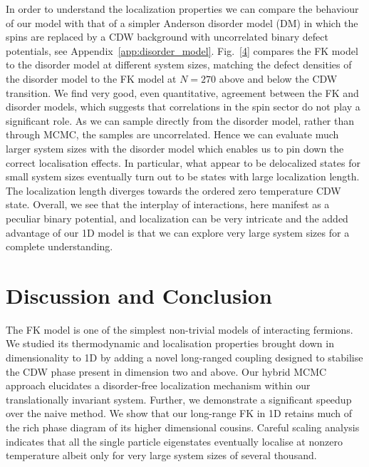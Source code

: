 In order to understand the localization properties we can compare the behaviour of our model with that of a simpler Anderson disorder model (DM) in which the spins are replaced by a CDW background with uncorrelated binary defect potentials, see Appendix~\protect\hyperlink{app:disorder_model}{{[}app:disorder\_model{]}}. Fig.~{[}\protect\hyperlink{fig:indiv_IPR_disorder}{4}{]} compares the FK model to the disorder model at different system sizes, matching the defect densities of the disorder model to the FK model at \(N = 270\) above and below the CDW transition. We find very good, even quantitative, agreement between the FK and disorder models, which suggests that correlations in the spin sector do not play a significant role. As we can sample directly from the disorder model, rather than through MCMC, the samples are uncorrelated. Hence we can evaluate much larger system sizes with the disorder model which enables us to pin down the correct localisation effects. In particular, what appear to be delocalized states for small system sizes eventually turn out to be states with large localization length. The localization length diverges towards the ordered zero temperature CDW state. Overall, we see that the interplay of interactions, here manifest as a peculiar binary potential, and localization can be very intricate and the added advantage of our 1D model is that we can explore very large system sizes for a complete understanding.

\hypertarget{fk-conclusion}{%
\section{Discussion and Conclusion}\label{fk-conclusion}}

The FK model is one of the simplest non-trivial models of interacting fermions. We studied its thermodynamic and localisation properties brought down in dimensionality to 1D by adding a novel long-ranged coupling designed to stabilise the CDW phase present in dimension two and above. Our hybrid MCMC approach elucidates a disorder-free localization mechanism within our translationally invariant system. Further, we demonstrate a significant speedup over the naive method. We show that our long-range FK in 1D retains much of the rich phase diagram of its higher dimensional cousins. Careful scaling analysis indicates that all the single particle eigenstates eventually localise at nonzero temperature albeit only for very large system sizes of several thousand.

